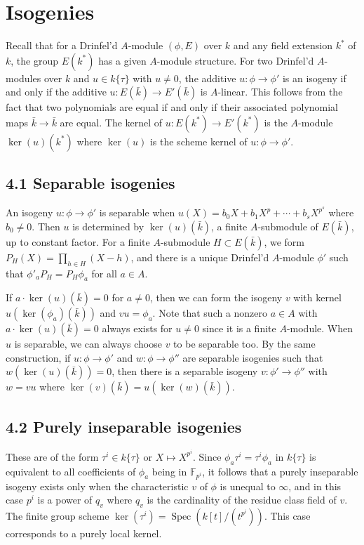 \documentclass[12pt,a4paper]{article}
\theoremstyle{plain}
\theoremstyle{definition}
\theoremstyle{remark}
\DeclareMathOperator{\Spec}{Spec}
\begin{document}
\section{Isogenies}

Recall that for a Drinfel'd $A$-module $(\phi, E)$ over $k$ and any field 
extension $k^*$ of $k$, the group $E(k^*)$ has a given $A$-module structure. 
For two Drinfel'd $A$-modules over $k$ and $u \in k\{\tau\}$ with $u \neq 0$, 
the additive $u\colon \phi \to \phi'$ is an isogeny if and only if the additive 
$u\colon E(\bar{k}) \to E'(\bar{k})$ is $A$-linear. This follows from the fact 
that two polynomials are equal if and only if their associated polynomial maps 
$\bar{k} \to \bar{k}$ are equal. The kernel of $u\colon E(k^*) \to E'(k^*)$ is 
the $A$-module $\ker(u)(k^*)$ where $\ker(u)$ is the scheme kernel of 
$u\colon \phi \to \phi'$.

\subsection*{4.1 Separable isogenies}

An isogeny $u\colon \phi \to \phi'$ is separable when 
$u(X) = b_0X + b_1X^p + \cdots + b_sX^{p^s}$ where $b_0 \neq 0$. Then $u$ is 
determined by $\ker(u)(\bar{k})$, a finite $A$-submodule of $E(\bar{k})$, up to 
constant factor. For a finite $A$-submodule $H \subset E(\bar{k})$, we form 
$P_H(X) = \prod_{h \in H}(X - h)$, and there is a unique Drinfel'd $A$-module 
$\phi'$ such that $\phi'_a P_H = P_H \phi_a$ for all $a \in A$.

If $a \cdot \ker(u)(\bar{k}) = 0$ for $a \neq 0$, then we can form the isogeny 
$v$ with kernel $u(\ker(\phi_a)(\bar{k}))$ and $vu = \phi_a$. Note that such 
a nonzero $a \in A$ with $a \cdot \ker(u)(\bar{k}) = 0$ always exists for 
$u \neq 0$ since it is a finite $A$-module. When $u$ is separable, we can 
always choose $v$ to be separable too. By the same construction, if 
$u\colon \phi \to \phi'$ and $w\colon \phi \to \phi''$ are separable isogenies 
such that $w(\ker(u)(\bar{k})) = 0$, then there is a separable isogeny 
$v\colon \phi' \to \phi''$ with $w = vu$ where 
$\ker(v)(\bar{k}) = u(\ker(w)(\bar{k}))$.

\subsection*{4.2 Purely inseparable isogenies}

These are of the form $\tau^i \in k\{\tau\}$ or $X \mapsto X^{p^i}$. Since 
$\phi_a \tau^i = \tau^i \phi_a$ in $k\{\tau\}$ is equivalent to all coefficients 
of $\phi_a$ being in $\mathbb{F}_{p^i}$, it follows that a purely inseparable 
isogeny exists only when the characteristic $v$ of $\phi$ is unequal to 
$\infty$, and in this case $p^i$ is a power of $q_v$ where $q_v$ is the 
cardinality of the residue class field of $v$. The finite group scheme 
$\ker(\tau^i) = \Spec(k[t]/(t^{p^i}))$. This case corresponds to a purely 
local kernel.
\end{document}
